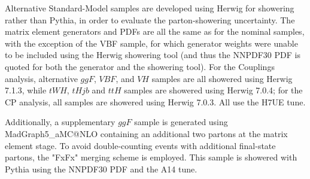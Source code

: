 Alternative Standard-Model samples are developed using Herwig for showering rather than Pythia, in order to evaluate the parton-showering uncertainty. The matrix element generators and PDFs are all the same as for the nominal samples, with the exception of the VBF sample, for which generator weights were unable to be included using the Herwig showering tool (and thus the NNPDF30 PDF is quoted for both the generator and the showering tool). For the Couplings analysis, alternative $ggF$, $VBF$, and $VH$ samples are all showered using Herwig 7.1.3, while $tWH$, $tHjb$ and $ttH$ samples are showered using Herwig 7.0.4; for the CP analysis, all samples are showered using Herwig 7.0.3. All use the H7UE tune.

Additionally, a supplementary $ggF$ sample is generated using {MadGraph5\_aMC@NLO} containing an additional two partons at the matrix element stage. To avoid double-counting events with additional final-state partons, the "FxFx" merging scheme is employed. This sample is showered with Pythia using the NNPDF30 PDF and the A14 tune.
 
\begin{table}[h!]
  \centering
  \caption{Summary of alternative signal samples}
  \label{tab:signal_samples_herwig}
\end{table}  

